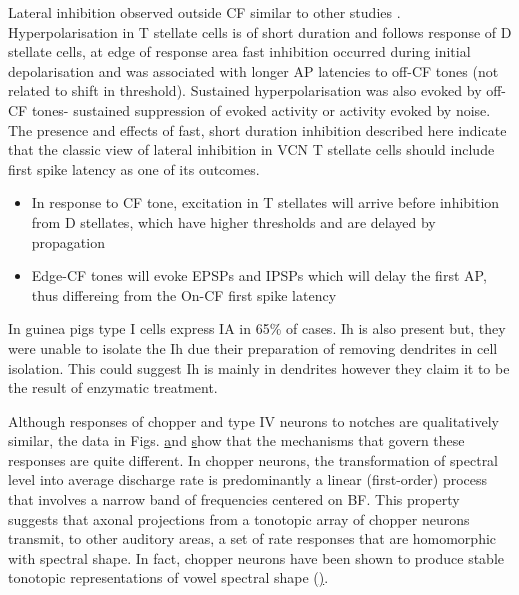 \documentclass[10pt,a4paper]{article}
\begin{document}
Lateral inhibition observed outside CF similar to other studies
\citep{FerragamoGoldingEtAl:1998a,FujinoOertel:2001,RhodeGreenberg:1994b}. Hyperpolarisation
in T stellate cells is of short duration and follows response of D stellate
cells, at edge of response area fast inhibition occurred during initial
depolarisation and was associated with longer AP latencies to off-CF tones (not
related to shift in threshold).  Sustained hyperpolarisation was also evoked by
off-CF tones- sustained suppression of evoked activity or activity evoked by
noise.  The presence and effects of fast, short duration inhibition described
here indicate that the classic view of lateral inhibition in VCN T stellate
cells should include first spike latency as one of its outcomes.


\begin{itemize}
\item In response to CF tone, excitation in T stellates will arrive before
  inhibition from D stellates, which have higher thresholds and are delayed by
  propagation
\item Edge-CF tones will evoke EPSPs and IPSPs which will delay the first AP,
  thus differeing from the On-CF first spike latency
\end{itemize}
In guinea pigs \citep{RothmanManis:2003a} type I cells express IA in 65\% of
cases. Ih is also present but, they were unable to isolate the Ih due their
preparation of removing dendrites in cell isolation. This could suggest Ih is
mainly in dendrites however they claim it to be the result of enzymatic
treatment.

\citep{RhodeGreenberg:1994b}

\citep{YuYoung:2000}

Although responses of chopper and type IV neurons to notches are qualitatively
similar, the data in Figs.
\href{www.pnas.org/cgi/content/full/97/22/11780#F5}
and
\href{www.pnas.org/cgi/content/full/97/22/11780#F6}
show that the mechanisms that govern these responses are quite different. In
chopper neurons, the transformation of spectral level into average discharge
rate is predominantly a linear (first-order) process that involves a narrow band
of frequencies centered on BF. This property suggests that axonal projections
from a tonotopic array of chopper neurons transmit, to other auditory areas, a
set of rate responses that are homomorphic with spectral shape. In fact, chopper
neurons have been shown to produce stable tonotopic representations of vowel
spectral shape
(\href{www.pnas.org/cgi/content/full/97/22/11780#B8}).
\end{document}
